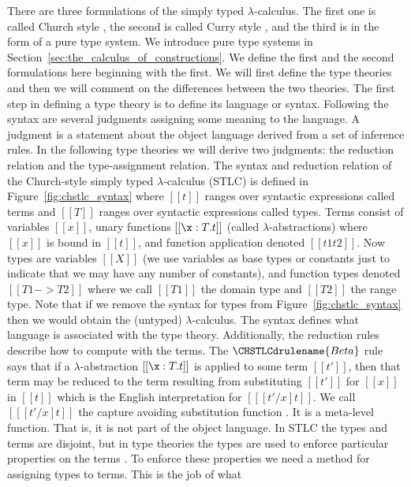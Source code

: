 There are three formulations of the simply typed $\lambda$-calculus.
The first one is called Church style
\cite{Girard:1989,Barendregt:1992,Church:1940}, the second is called
Curry style \cite{Barendregt:1992,Reynolds:1998}, and the third is in
the form of a pure type system.  We introduce pure type systems in
Section~\ref{sec:the_calculus_of_constructions}.  We define the first
and the second formulations here beginning with the first.  We will
first define the type theories and then we will comment on the
differences between the two theories.  The first step in defining a
type theory is to define its language or syntax.  Following the syntax
are several judgments assigning some meaning to the language.  A
judgment is a statement about the object language derived from a set
of inference rules.  In the following type theories we will derive two
judgments: the reduction relation and the type-assignment relation.
The syntax and reduction relation of the Church-style simply typed
$\lambda$-calculus (STLC) is defined in Figure~\ref{fig:chstlc_syntax}
where $[[t]]$ ranges over syntactic expressions called terms and
$[[T]]$ ranges over syntactic expressions called types. Terms consist
of variables $[[x]]$, unary functions $[[\x:T.t]]$ (called
$\lambda$-abstractions) where $[[x]]$ is bound in $[[t]]$, and
function application denoted $[[t1 t2]]$.  Now types are variables
$[[X]]$ (we use variables as base types or constants just to indicate
that we may have any number of constants), and function types denoted
$[[T1 -> T2]]$ where we call $[[T1]]$ the domain type and $[[T2]]$ the
range type.  Note that if we remove the syntax for types from
Figure~\ref{fig:chstlc_syntax} then we would obtain the (untyped)
$\lambda$-calculus.  The syntax defines what language is associated
with the type theory.  Additionally, the reduction rules describe how
to compute with the terms.  The $\CHSTLCdrulename{Beta}$ rule says
that if a $\lambda$-abstraction $[[\x:T.t]]$ is applied to some term
$[[t']]$, then that term may be reduced to the term resulting from
substituting $[[t']]$ for $[[x]]$ in $[[t]]$ which is the English
interpretation for $[[ [t'/x]t]]$. We call $[[ [t'/x] t]]$ the capture
avoiding substitution function . It is a meta-level function. That is,
it is not part of the object language. In STLC the types and terms are
disjoint, but in type theories the types are used to enforce
particular properties on the terms .  To enforce these properties we
need a method for assigning types to terms.  This is the job of what
